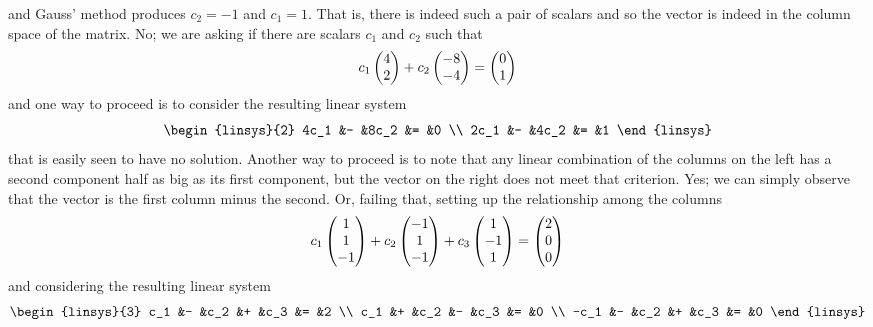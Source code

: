 \begin{exercises}
\begin{answer}
\begin{exparts}
          and Gauss' method produces \( c_2=-1 \) and \( c_1=1 \). 
          That is, there is indeed such a pair of scalars and so the vector
          is indeed in the column space of the matrix.
        \partsitem No;
          we are asking if there are scalars $c_1$ and $c_2$
          such that 
          \begin{equation*}
            c_1\begin{pmatrix} 4 \\ 2 \end{pmatrix}+c_2\begin{pmatrix} -8 \\ -4 \end{pmatrix}=\begin{pmatrix} 0 \\ 1 \end{pmatrix}
          \end{equation*}
          and one way to proceed is to consider the resulting linear system
          \begin{equation*}
            \begin{linsys}{2}
              4c_1  &-  &8c_2  &=  &0  \\
              2c_1  &-  &4c_2  &=  &1
            \end{linsys}
          \end{equation*}
          that is easily seen to have no solution.
          Another way to proceed is to note
          that any linear combination of the columns on the left
          has a second component half as big as its first component, 
          but the  vector on the right does not meet that criterion.
        \partsitem Yes; we can simply observe that the vector
          is the first column minus the second.
          Or, failing that, setting up the relationship among the columns 
          \begin{equation*}
            c_1\begin{pmatrix} 1 \\ 1 \\ -1 \end{pmatrix}
             +c_2\begin{pmatrix} -1 \\ 1 \\ -1 \end{pmatrix}
             +c_3\begin{pmatrix} 1 \\ -1 \\ 1 \end{pmatrix}
             =\begin{pmatrix} 2 \\ 0 \\ 0 \end{pmatrix}
          \end{equation*}
          and considering the resulting linear system
          \begin{equation*}
            \begin{linsys}{3}
              c_1  &-  &c_2  &+  &c_3  &=  &2  \\
              c_1  &+  &c_2  &-  &c_3  &=  &0  \\
             -c_1  &-  &c_2  &+  &c_3  &=  &0    

\end{linsys}
\end{equation*}
\end{exparts}
\end{answer}
\end{exercises}
